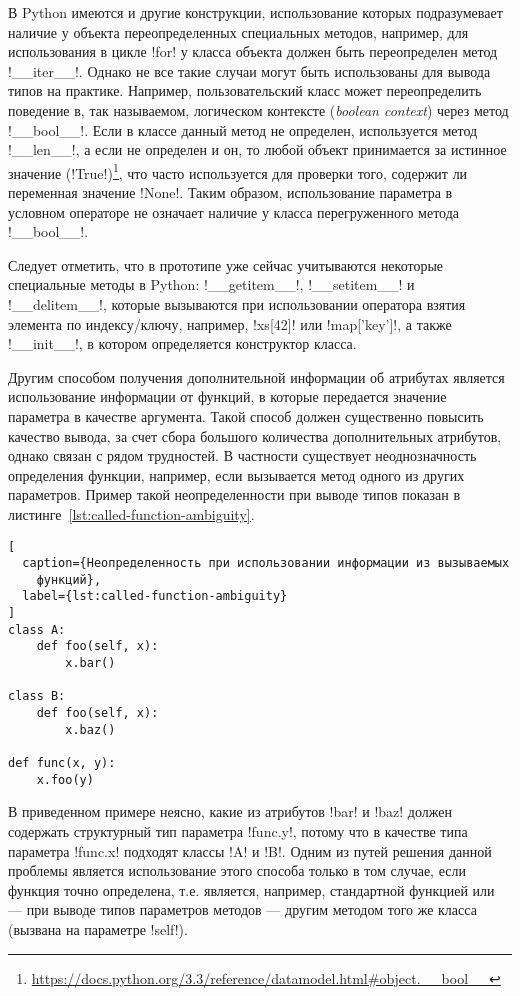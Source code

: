В Python имеются и другие конструкции, использование которых подразумевает
наличие у объекта переопределенных специальных методов, например, для
использования в цикле !for! у класса объекта должен быть переопределен метод
!__iter__!. Однако не все такие случаи могут быть использованы для вывода типов
на практике. Например, пользовательский класс может переопределить поведение в,
так называемом, логическом контексте (\emph{boolean context}) через метод
!__bool__!. Если в классе данный метод не определен, используется метод
!__len__!, а если не определен и он, то любой объект принимается за истинное
значение
(!True!)\footnote{\url{https://docs.python.org/3.3/reference/datamodel.html\#object.\_\_bool\_\_}},
что часто используется для проверки того, содержит ли переменная значение
!None!. Таким образом, использование параметра в условном операторе не означает
наличие у класса перегруженного метода !__bool__!.

Следует отметить, что в прототипе уже сейчас учитываются некоторые специальные
методы в Python: !__getitem__!, !__setitem__! и !__delitem__!,
которые вызываются при использовании оператора взятия элемента по индексу/ключу,
например, !xs[42]! или !map['key']!, а также !__init__!, в котором определяется
конструктор класса.

Другим способом получения дополнительной информации об атрибутах является
использование информации от функций, в которые передается значение параметра в
качестве аргумента. Такой способ должен существенно повысить качество вывода, за
счет сбора большого количества дополнительных атрибутов, однако связан с рядом
трудностей. В частности существует неоднозначность определения функции,
например, если вызывается метод одного из других параметров. Пример такой
неопределенности при выводе типов показан в
листинге~\ref{lst:called-function-ambiguity}.

\begin{lstlisting}[
  caption={Неопределенность при использовании информации из вызываемых
    функций},
  label={lst:called-function-ambiguity}
]
class A:
    def foo(self, x):
        x.bar()

class B:
    def foo(self, x):
        x.baz()

def func(x, y):
    x.foo(y)
\end{lstlisting}

В приведенном примере неясно, какие из атрибутов !bar! и !baz! должен содержать
структурный тип параметра !func.y!, потому что в качестве типа параметра
!func.x! подходят классы !A! и !B!. Одним из путей решения данной проблемы
является использование этого способа только в том случае, если функция точно
определена, т.е. является, например, стандартной функцией или --- при выводе
типов параметров методов --- другим методом того же класса (вызвана на параметре
!self!).

